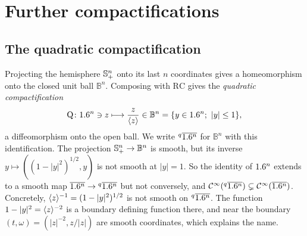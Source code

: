 \section{Further compactifications}\label{distributions:sec:other}

\subsection{The quadratic compactification}
Projecting the hemisphere $\mathbb{S}^n_+$ onto its last $n$ coordinates gives a
homeomorphism onto the closed unit ball $\mathbb{B}^n$. Composing with $\mathrm{RC}$
gives the \emph{quadratic compactification}
\begin{equation}\label{distributions:eq:QRC}
  \mathrm{Q}\colon1.6^n\ni z\longmapsto\frac z{\langle z\rangle}\in\mathbb{B}^n=\{y\in1.6^n;\ |y|\le1\},
\end{equation}
a diffeomorphism onto the open ball. We write ${}^{q}\overline{1.6^n}$ for $\mathbb{B}^n$ with this
identification. The projection $\mathbb{S}^n_+\to\mathbb{B}^n$ is smooth, but its inverse
$y\mapsto((1-|y|^2)^{1/2},y)$ is not smooth at $|y|=1$. So the identity of $1.6^n$
extends to a smooth map $\overline{1.6^n}\to{}^{q}\overline{1.6^n}$ but not conversely, and
$\mathcal{C}^\infty({}^{q}\overline{1.6^n})\subsetneq\mathcal{C}^\infty(\overline{1.6^n})$. Concretely, $\langle z\rangle^{-1}=(1-|y|^2)^{1/2}$ is
not smooth on ${}^{q}\overline{1.6^n}$. The function $1-|y|^2=\langle z\rangle^{-2}$ is a boundary defining
function there, and near the boundary $(t,\omega)=(|z|^{-2},z/|z|)$ are smooth
coordinates, which explains the name.

